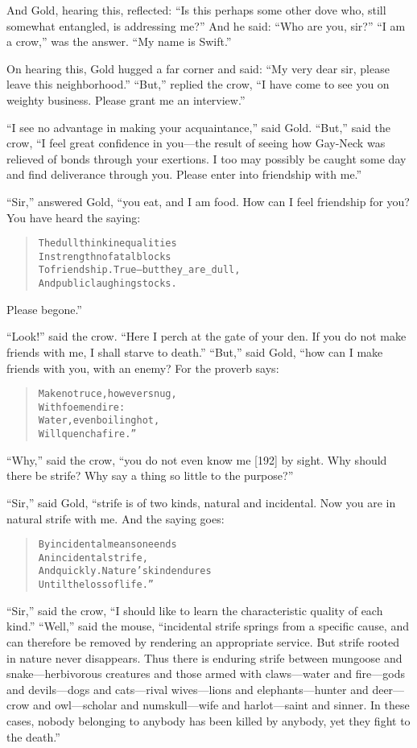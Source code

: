 \documentclass[article, twoside, 14pt]{memoir}
\renewenvironment{verbatim}{%
\begin{quote}%
\vskip -10pt%
\begin{alltt}\normalfont\large}{\end{alltt}%
\end{quote}%
\vskip -10pt
} %
\begin{document}
And Gold, hearing this, reflected:
``Is this perhaps some other dove who, still somewhat entangled, is addressing me?''
And he said: ``Who are you, sir?'' ``I am a crow,'' was the answer.
``My name is Swift.''

On hearing this, Gold hugged a far corner and said:
``My very dear sir, please leave this neighborhood.'' ``But,''
replied the crow,
``I have come to see you on weighty business. Please grant me an interview.''

``I see no advantage in making your acquaintance,'' said Gold.
``But,'' said the crow,
``I feel great confidence in you---the result of seeing how Gay-Neck was relieved of bonds through your exertions. I too may possibly be caught some day and find deliverance through you. Please enter into friendship with me.''

``Sir,'' answered Gold, “you eat, and I am food. How can I feel
friendship for you? You have heard the saying:

\begin{verbatim}
The dull think inequalities
    In strength no fatal blocks
To friendship. True--but they _are_ dull,
    And public laughingstocks.
\end{verbatim}
Please begone.”

``Look!'' said the crow.
``Here I perch at the gate of your den. If you do not make friends with me, I shall starve to death.''
``But,'' said Gold, “how can I make friends with you, with an
enemy? For the proverb says:

\begin{verbatim}
Make no truce, however snug,
    With foemen dire:
Water, even boiling hot,
    Will quench a fire.”
\end{verbatim}
``Why,'' said the crow,
``you do not even know me [192] by sight. Why should there be strife? Why say a thing so little to the purpose?''

``Sir,'' said Gold, “strife is of two kinds, natural and
incidental. Now you are in natural strife with me. And the saying
goes:

\begin{verbatim}
By incidental means one ends
    An incidental strife,
And quickly. Nature's kind endures
    Until the loss of life.”
\end{verbatim}
``Sir,'' said the crow,
``I should like to learn the characteristic quality of each kind.''
``Well,'' said the mouse,
``incidental strife springs from a specific cause, and can therefore be removed by rendering an appropriate service. But strife rooted in nature never disappears. Thus there is enduring strife between mungoose and snake---herbivorous creatures and those armed with claws---water and fire---gods and devils---dogs and cats---rival wives---lions and elephants---hunter and deer---crow and owl---scholar and numskull---wife and harlot---saint and sinner. In these cases, nobody belonging to anybody has been killed by anybody, yet they fight to the death.''
\end{document}

